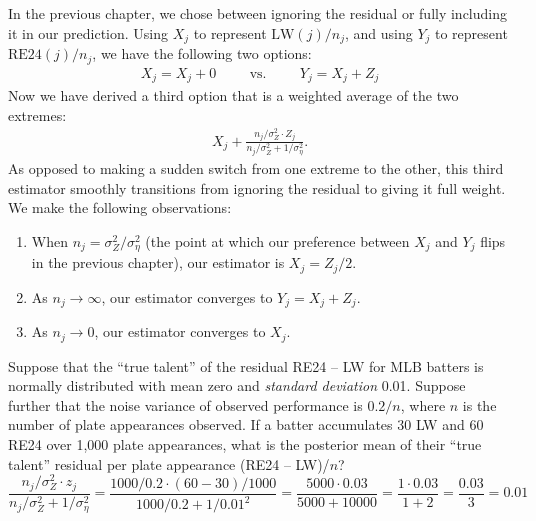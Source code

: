 \documentclass{article}
\begin{document}
      In the previous chapter, we chose between ignoring the residual or fully including it in our prediction. Using $X_j$ to represent $\mbox{LW}(j) / n_j$, and using $Y_j$ to represent $\mbox{RE24}(j) / n_j$, we have the following two options:
      \begin{align*}
        X_j = X_j + 0 \hspace{1cm} \mbox{vs.} \hspace{1cm} Y_j = X_j + Z_j
      \end{align*}
      Now we have derived a third option that is a weighted average of the two extremes:
      \begin{align*}
        X_j + \frac{n_j / \sigma^2_Z \cdot Z_j}{n_j / \sigma^2_Z + 1 / \sigma^2_\eta}.
      \end{align*}
      As opposed to making a sudden switch from one extreme to the other, this third estimator smoothly transitions from ignoring the residual to giving it full weight. We make the following observations:
      \begin{enumerate}
        \item When $n_j = \sigma^2_Z / \sigma^2_\eta$ (the point at which our preference between $X_j$ and $Y_j$ flips in the previous chapter), our estimator is $X_j = Z_j / 2$.
        \item As $n_j \rightarrow \infty$, our estimator converges to $Y_j = X_j + Z_j$.
        \item As $n_j \rightarrow 0$, our estimator converges to $X_j$.
      \end{enumerate}

      \begin{framed}
         Suppose that the ``true talent'' of the residual RE24 -- LW for MLB batters is normally distributed with mean zero and {\it standard deviation} 0.01. Suppose further that the noise variance of observed performance is $0.2/n$, where $n$ is the number of plate appearances observed. If a batter accumulates 30 LW and 60 RE24 over 1,000 plate appearances, what is the posterior mean of their ``true talent'' residual per plate appearance (RE24 -- LW)/$n$?
        $$
          \frac{n_j / \sigma^2_Z \cdot z_j}{n_j / \sigma^2_Z + 1 / \sigma^2_\eta} =
            \frac{1000 / 0.2 \cdot (60 - 30) / 1000}{1000 / 0.2 + 1 / 0.01^2} =
            \frac{5000 \cdot 0.03}{5000 + 10000} =
            \frac{1 \cdot 0.03}{1 + 2} =
            \frac{0.03}{3} =
            0.01
        $$
      \end{framed}
    
\end{document}
